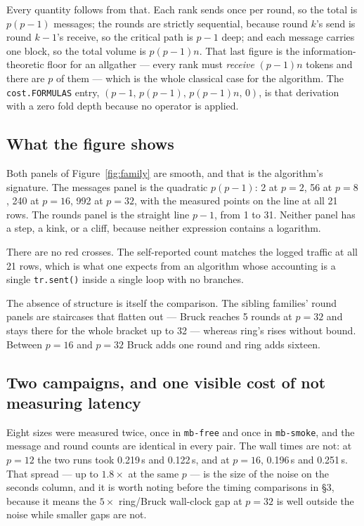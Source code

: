 \documentclass[11pt]{article}
\begin{document}
Every quantity follows from that. Each rank sends once per round, so the total is $p(p-1)$
messages; the rounds are strictly sequential, because round $k$'s send is round $k-1$'s receive,
so the critical path is $p-1$ deep; and each message carries one block, so the total volume is
$p(p-1)n$. That last figure is the information-theoretic floor for an allgather --- every rank
must \emph{receive} $(p-1)n$ tokens and there are $p$ of them --- which is the whole classical
case for the algorithm. The \texttt{cost.FORMULAS} entry, $(p-1,\, p(p-1),\, p(p-1)n,\, 0)$,
is that derivation with a zero fold depth because no operator is applied.

\subsection{What the figure shows}

Both panels of Figure~\ref{fig:family} are smooth, and that is the algorithm's signature. The
messages panel is the quadratic $p(p-1)$: 2 at $p=2$, 56 at $p=8$, 240 at $p=16$, 992 at $p=32$,
with the measured points on the line at all 21 rows. The rounds panel is the straight line
$p-1$, from 1 to 31. Neither panel has a step, a kink, or a cliff, because neither expression
contains a logarithm.

There are no red crosses. The self-reported count matches the logged traffic at all 21 rows,
which is what one expects from an algorithm whose accounting is a single \texttt{tr.sent()} inside
a single loop with no branches.

The absence of structure is itself the comparison. The sibling families' round panels are
staircases that flatten out --- Bruck reaches 5 rounds at $p=32$ and stays there for the whole
bracket up to 32 --- whereas ring's rises without bound. Between $p=16$ and $p=32$ Bruck adds one
round and ring adds sixteen.

\subsection{Two campaigns, and one visible cost of not measuring latency}

Eight sizes were measured twice, once in \texttt{mb-free} and once in \texttt{mb-smoke}, and the
message and round counts are identical in every pair. The wall times are not: at $p=12$ the two
runs took 0.219\,s and 0.122\,s, and at $p=16$, 0.196\,s and 0.251\,s. That spread --- up to
$1.8\times$ at the same $p$ --- is the size of the noise on the seconds column, and it is worth
noting before the timing comparisons in \S3, because it means the $5\times$ ring/Bruck wall-clock
gap at $p=32$ is well outside the noise while smaller gaps are not.
\end{document}
